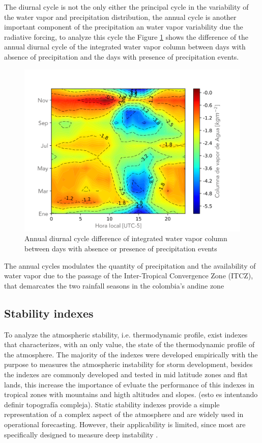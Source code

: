 \documentclass[	DIV=calc,%
							paper=a4,%
							fontsize=11pt,%
							twocolumn]{scrartcl}	 					%
\begin{document}
The diurnal cycle  is not the only either the principal cycle in the variability of the water vapor and precipitation distribution, the annual cycle is another important component of the precipitation an water vapor variability due the radiative forcing, to analyze this cycle the Figure \ref{fig:VapDifference} shows the difference of the annual diurnal cycle of the integrated water vapor column between days with absence of precipitation and the days with presence of precipitation events.

\begin{figure}[h!]
\centering
\includegraphics[width=1.0\linewidth]{Figuras/Vap_Resta_Matrix.png}
\caption{Annual diurnal cycle difference of integrated water vapor column between days with absence or presence of precipitation events }
\label{fig:VapDifference}
\end{figure}

The annual cycles modulates the quantity of precipitation and the availability of water vapor due to the passage of the Inter-Tropical Convergence Zone (ITCZ), that demarcates the two rainfall seasons in the colombia's andine zone 



\subsection{Stability indexes}

To analyze the atmospheric stability, i.e. thermodynamic profile, exist indexes that characterizes, with an only value, the state of the thermodynamic profile of the atmosphere. The majority of the indexes were developed empirically with the purpose to measures the atmospheric instability for storm development, besides the indexes are commonly developed and tested in mid latitude zones and flat lands, this increase the importance of evluate the performance of this indexes in tropical zones with mountains and higth altitudes and slopes. (esto es intentando definir topografía compleja). Static stability indexes provide a simple representation of a complex aspect of the atmosphere and are widely used in operational forecasting. However, their applicability is limited, since most are specifically designed to measure deep instability \citep{henry2000static}.
\end{document}
